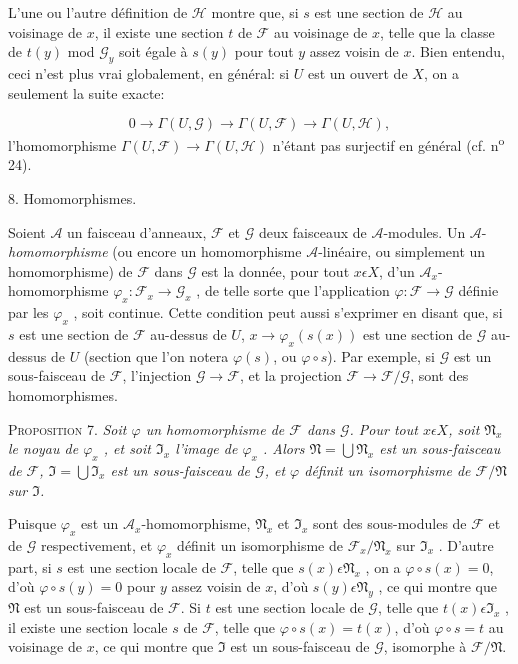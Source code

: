 L'une ou l'autre définition de $\mathcal{H}$ montre que, si $s$ est une section de $\mathcal{H}$ au voisinage de $x$, il existe une section $t$ de $\mathcal{F}$ au voisinage de $x$, telle que la classe de $t(y)$ mod $\mathcal{G}_y$ soit égale à $s(y)$ pour tout $y$ assez voisin de $x$. Bien entendu, ceci n'est plus vrai globalement, en général: si $U$ est un ouvert de $X$, on a seulement la suite exacte:

\begin{equation*}
0 \to \Gamma(U, \mathcal{G}) \to \Gamma(U, \mathcal{F}) \to \Gamma(U, \mathcal{H}),
\end{equation*}
l'homomorphisme $\Gamma(U, \mathcal{F}) \to \Gamma(U, \mathcal{H})$ n'étant pas surjectif en général (cf. n\textsuperscript{o} 24).


8. Homomorphismes.

Soient $\mathcal{A}$ un faisceau d'anneaux, $\mathcal{F}$ et $\mathcal{G}$ deux faisceaux de $\mathcal{A}$-modules. Un $\mathcal{A}$-\emph{homomorphisme} (ou encore un homomorphisme $\mathcal{A}$-linéaire, ou simplement un homomorphisme) de $\mathcal{F}$ dans $\mathcal{G}$ est la donnée, pour tout $x \epsilon X$, d'un $\mathcal{A}_x$-homomorphisme $\varphi_x : \mathcal{F}_x \to \mathcal{G}_x$ , de telle sorte que l'application $\varphi : \mathcal{F} \to \mathcal{G}$ définie par les $\varphi_x$ , soit continue. Cette condition peut aussi s'exprimer en disant que, si $s$ est une section de $\mathcal{F}$ au-dessus de $U$, $x \to \varphi_x(s(x))$ est une section de $\mathcal{G}$ au-dessus de $U$ (section que l'on notera $\varphi(s)$, ou $\varphi \circ s$). Par exemple, si $\mathcal{G}$ est un sous-faisceau de $\mathcal{F}$, l'injection $\mathcal{G} \to \mathcal{F}$, et la projection $\mathcal{F} \to \mathcal{F}/\mathcal{G}$, sont des homomorphismes.

\textsc{Proposition} 7. \emph{Soit $\varphi$ un homomorphisme de $\mathcal{F}$ dans $\mathcal{G}$. Pour tout $x \epsilon X$, soit $\mathfrak{N}_x$ le noyau de $\varphi_x$ , et soit $\mathfrak{I}_x$ l'image de $\varphi_x$ . Alors $\mathfrak{N} = \bigcup \mathfrak{N}_x$ est un sous-faisceau de $\mathcal{F}$, $\mathfrak{I} = \bigcup \mathfrak{I}_x$ est un sous-faisceau de $\mathcal{G}$, et $\varphi$ définit un isomorphisme de $\mathcal{F}/\mathfrak{N}$ sur $\mathfrak{I}$.}

Puisque $\varphi_x$ est un $\mathcal{A}_x$-homomorphisme, $\mathfrak{N}_x$ et $\mathfrak{I}_x$ sont des sous-modules de $\mathcal{F}$ et de $\mathcal{G}$ respectivement, et $\varphi_x$ définit un isomorphisme de $\mathcal{F}_x/\mathfrak{N}_x$ sur $\mathfrak{I}_x$ . D'autre part, si $s$ est une section locale de $\mathcal{F}$, telle que $s(x) \epsilon \mathfrak{N}_x$ , on a $\varphi \circ s(x) = 0$, d'où $\varphi \circ s(y) = 0$ pour $y$ assez voisin de $x$, d'où $s(y) \epsilon \mathfrak{N}_y$ , ce qui montre que $\mathfrak{N}$ est un sous-faisceau de $\mathcal{F}$. Si $t$ est une section locale de $\mathcal{G}$, telle que $t(x) \epsilon \mathfrak{I}_x$ , il existe une section locale $s$ de $\mathcal{F}$, telle que $\varphi \circ s(x) = t(x)$, d'où $\varphi \circ s = t$ au voisinage de $x$, ce qui montre que $\mathfrak{I}$ est un sous-faisceau de $\mathcal{G}$, isomorphe à $\mathcal{F}/\mathfrak{N}$.


